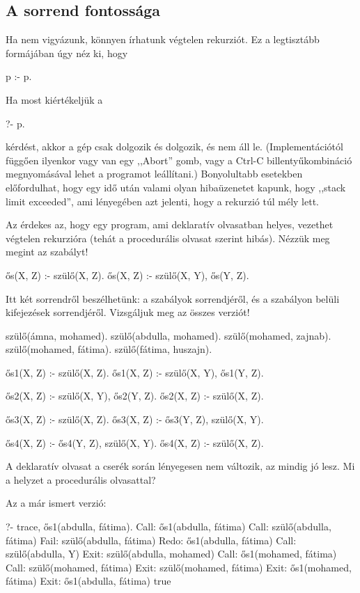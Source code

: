 \subsection*{A sorrend fontossága}

Ha nem vigyázunk, könnyen írhatunk végtelen rekurziót. Ez a legtisztább formájában úgy néz ki, hogy
\begin{program}
p :- p.
\end{program}

Ha most kiértékeljük a
\begin{query}
?- p.
\end{query}
kérdést, akkor a gép csak dolgozik és dolgozik, és
nem áll le. (Implementációtól függően ilyenkor vagy
van egy ,,Abort'' gomb, vagy a Ctrl-C
billentyűkombináció megnyomásával lehet a programot
leállítani.) Bonyolultabb esetekben előfordulhat,
hogy egy idő után valami olyan hibaüzenetet kapunk,
hogy ,,stack limit exceeded'', ami lényegében azt
jelenti, hogy a rekurzió túl mély lett.

Az érdekes az, hogy egy program, ami deklaratív
olvasatban helyes, vezethet végtelen rekurzióra
(tehát a procedurális olvasat szerint hibás). Nézzük
meg megint az  szabályt!
\begin{program}
ős(X, Z) :- szülő(X, Z).
ős(X, Z) :- szülő(X, Y), ős(Y, Z).
\end{program}
Itt két sorrendről beszélhetünk: a szabályok
sorrendjéről, és a szabályon belüli kifejezések
sorrendjéről. Vizsgáljuk meg az összes verziót!
\begin{program}
szülő(ámna, mohamed).
szülő(abdulla, mohamed).
szülő(mohamed, zajnab).
szülő(mohamed, fátima).
szülő(fátima, huszajn).

ős1(X, Z) :- szülő(X, Z).
ős1(X, Z) :- szülő(X, Y), ős1(Y, Z).

ős2(X, Z) :- szülő(X, Y), ős2(Y, Z).
ős2(X, Z) :- szülő(X, Z).

ős3(X, Z) :- szülő(X, Z).
ős3(X, Z) :- ős3(Y, Z), szülő(X, Y).

ős4(X, Z) :- ős4(Y, Z), szülő(X, Y).
ős4(X, Z) :- szülő(X, Z).
\end{program}
A deklaratív olvasat a cserék során lényegesen nem
változik, az mindig jó lesz. Mi a helyzet a
procedurális olvasattal?

Az  a már ismert verzió:
\begin{query}
?- trace, ős1(abdulla, fátima).
Call: ős1(abdulla, fátima)
  Call: szülő(abdulla, fátima)
  Fail: szülő(abdulla, fátima)
Redo: ős1(abdulla, fátima)
  Call: szülő(abdulla, Y)
  Exit: szülő(abdulla, mohamed)
  Call: ős1(mohamed, fátima)
    Call: szülő(mohamed, fátima)
    Exit: szülő(mohamed, fátima)
  Exit: ős1(mohamed, fátima)
Exit: ős1(abdulla, fátima)
true
\end{query}

